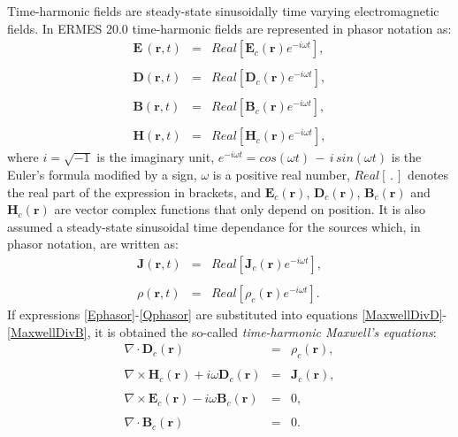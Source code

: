 Time-harmonic fields are steady-state sinusoidally time varying electromagnetic fields. In ERMES 20.0 time-harmonic fields are represented in phasor notation as:
\begin{eqnarray}
    \mathbf{E}\,(\mathbf{r},t) &=& Real\left[\mathbf{E}_{c}(\mathbf{r})e^{-i\omega t}\right],\label{Ephasor}
	\\\nonumber
	\\[-1em]
	\mathbf{D}(\mathbf{r},t) &=& Real\left[\mathbf{D}_{c}(\mathbf{r})e^{-i\omega t}\right],\label{Dphasor}
    \\\nonumber
	\\[-1em]
	\mathbf{B}(\mathbf{r},t) &=& Real\left[\mathbf{B}_{c}(\mathbf{r})e^{-i\omega t}\right],\label{Bphasor}
	\\\nonumber
	\\[-1em]
	\mathbf{H}(\mathbf{r},t) &=& Real\left[\mathbf{H}_{c}(\mathbf{r})e^{-i\omega t}\right],\label{Hphasor}
\end{eqnarray}
where $i = \sqrt{-1}$  is the imaginary unit, $e^{-i\omega t} = cos(\omega t)\,-\,i\,sin(\omega t)$ is the Euler's formula modified by a sign, $\omega$ is a positive real number, $Real[\,.\,]$ denotes the real part of the expression in brackets, and $\mathbf{E}_{c}(\mathbf{r})$, $\mathbf{D}_{c}(\mathbf{r})$, $\mathbf{B}_{c}(\mathbf{r})$ and $\mathbf{H}_{c}(\mathbf{r})$ are vector complex functions that only depend on position. It is also assumed a steady-state sinusoidal time dependance for the sources which, in phasor notation, are written as:
\begin{eqnarray}
    \mathbf{J}(\mathbf{r},t) &=& Real\left[\mathbf{J}_{c}(\mathbf{r})e^{-i\omega t}\right],\label{Jphasor}
	\\\nonumber
	\\[-1em]
	\rho(\mathbf{r},t) &=& Real\left[\rho_{c}(\mathbf{r})e^{-i\omega t}\right].\label{Qphasor}
\end{eqnarray}
If expressions \eqref{Ephasor}-\eqref{Qphasor} are substituted into equations \eqref{MaxwellDivD}-\eqref{MaxwellDivB}, it is obtained the so-called \emph{time-harmonic Maxwell's equations}: 
\begin{eqnarray}
    \nabla\cdot\mathbf{D}_{c}(\mathbf{r}) &=& \rho_{c}(\mathbf{r}), \label{MaxwellDivDFD}
	\\\nonumber
	\\[-1em]
	\nabla\times\mathbf{H}_{c}(\mathbf{r}) + i\omega\mathbf{D}_{c}(\mathbf{r}) &=& \mathbf{J}_{c}(\mathbf{r}), \label{MaxwellRotHFD}
	\\\nonumber
	\\[-1em]
	\nabla\times\mathbf{E}_{c}(\mathbf{r}) - i\omega\mathbf{B}_{c}(\mathbf{r}) &=& 0, \label{MaxwellRotEFD}
	\\\nonumber
	\\[-1em]
	\nabla\cdot\mathbf{B}_{c}(\mathbf{r}) &=& 0. \label{MaxwellDivBFD}
\end{eqnarray}
